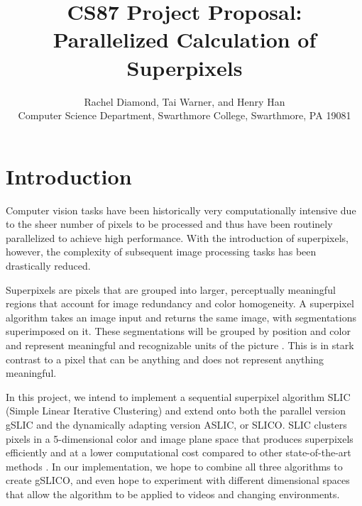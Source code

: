 \documentclass[11pt]{article}
\begin{document}

\title{CS87 Project Proposal: Parallelized Calculation of Superpixels}

\author{Rachel Diamond, Tai Warner, and Henry Han \\
Computer Science Department, Swarthmore College, Swarthmore, PA  19081}

\maketitle

\section {Introduction}\label{intro}

Computer vision tasks have been historically very computationally intensive due to the sheer number of pixels to be processed and thus have been routinely parallelized to achieve high performance. With the introduction of superpixels, however, the complexity of subsequent image processing tasks has been drastically reduced.

Superpixels are pixels that are grouped into larger, perceptually meaningful regions that account for image redundancy and color homogeneity. A superpixel algorithm takes an image input and returns the same image, with segmentations superimposed on it. These segmentations will be grouped by position and color and represent meaningful and recognizable units of the picture \cite{slic}. This is in stark contrast to a pixel that can be anything and does not represent anything meaningful.

In this project, we intend to implement a sequential superpixel algorithm SLIC (Simple Linear Iterative Clustering) and extend onto both the parallel version gSLIC and the dynamically adapting version ASLIC, or SLICO. SLIC clusters pixels in a 5-dimensional color and image plane space that produces superpixels efficiently and at a lower computational cost compared to other state-of-the-art methods \cite{slic}. In our implementation, we hope to combine all three algorithms to create gSLICO, and even hope to experiment with different dimensional spaces that allow the algorithm to be applied to videos and changing environments.
\end{document}
